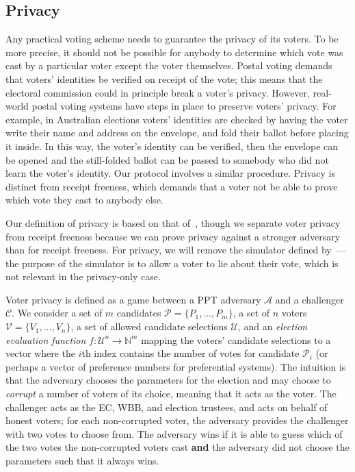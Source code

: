 \documentclass[12pt,a4paper]{article}
\theoremstyle{definition}
\begin{document}
\subsection{Privacy}
Any practical voting scheme needs to guarantee the privacy of its voters. To be more precise, it should not be possible for anybody to determine which vote was cast by a particular voter except the voter themselves. Postal voting demands that voters' identities be verified on receipt of the vote; this means that the electoral commission could in principle break a voter's privacy. However, real-world postal voting systems have steps in place to preserve voters' privacy. For example, in Australian elections voters' identities are checked by having the voter write their name and address on the envelope, and fold their ballot before placing it inside. In this way, the voter's identity can be verified, then the envelope can be opened and the still-folded ballot can be passed to somebody who did not learn the voter's identity. Our protocol involves a similar procedure. Privacy is distinct from receipt freeness, which demands that a voter not be able to prove which vote they cast to anybody else.

Our definition of privacy is based on that of~\cite{kiayias2015end}, though we separate voter privacy from receipt freeness because we can prove privacy against a stronger adversary than for receipt freeness. For privacy, we will remove the simulator defined by~\cite{kiayias2015end}---the purpose of the simulator is to allow a voter to lie about their vote, which is not relevant in the privacy-only case.

Voter privacy is defined as a game between a PPT adversary $\mathcal{A}$ and a challenger $\mathcal{C}$. We consider a set of $m$ candidates $\mathcal{P}=\{P_1,\ldots,P_m\}$, a set of $n$ voters $\mathcal{V}=\{V_1,\ldots,V_n\}$, a set of allowed candidate selections $\mathcal{U}$, and an \textit{election evaluation function} $f : \mathcal{U}^n \to \mathbb{N}^m$ mapping the voters' candidate selections to a vector where the $i$th index contains the number of votes for candidate $\mathcal{P}_i$ (or perhaps a vector of preference numbers for preferential systems). The intuition is that the adversary chooses the parameters for the election and may choose to \textit{corrupt} a number of voters of its choice, meaning that it acts as the voter. The challenger acts as the EC, WBB, and election trustees, and acts on behalf of honest voters; for each non-corrupted voter, the adversary provides the challenger with two votes to choose from. The adversary wins if it is able to guess which of the two votes the non-corrupted voters cast \textbf{and} the adversary did not choose the parameters such that it always wins.
\end{document}
